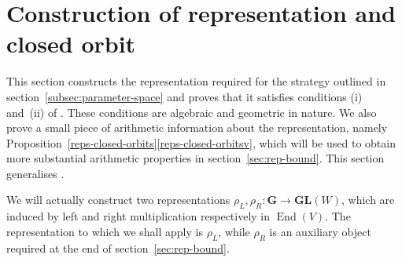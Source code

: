 \documentclass[11pt]{article}
\numberwithin{equation}{section}
\newcommand{\gG}{\mathbf{G}}
\newcommand{\gGL}{\mathbf{GL}}
\DeclareMathOperator{\End}{End}
\begin{document}
\section{Construction of representation and closed orbit} \label{sec:representation}

This section constructs the representation required for the strategy outlined in section~\ref{subsec:parameter-space} and proves that it satisfies conditions (i) and~(ii) of \cite[Th.\,1.2]{QRTUI}.
These conditions are algebraic and geometric in nature.
We also prove a small piece of arithmetic information about the representation, namely Proposition~\ref{reps-closed-orbits}\eqref{reps-closed-orbitsv}, which will be used to obtain more substantial arithmetic properties in section~\ref{sec:rep-bound}.
This section generalises \cite[\S\S 5.2 \&~5.3]{QRTUI}.

We will actually construct two representations $\rho_L, \rho_R \colon \gG \to \gGL(W)$, which are induced by left and right multiplication respectively in $\End(V)$.
The representation to which we shall apply \cite[Th.\,1.2]{QRTUI} is $\rho_L$, while $\rho_R$ is an auxiliary object required at the end of section~\ref{sec:rep-bound}.
\end{document}
